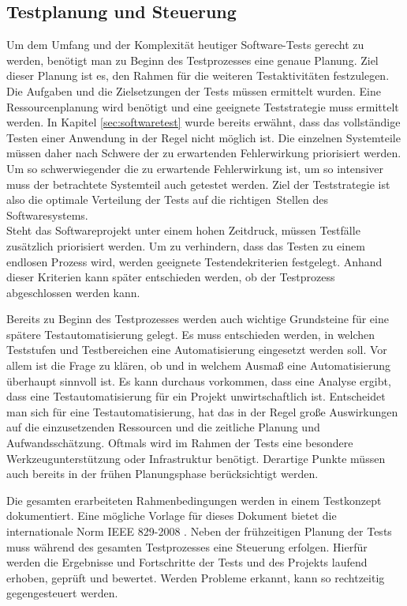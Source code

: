 \subsection{Testplanung und Steuerung}
\label{subsec:testplanung_und_steuerung}
Um dem Umfang und der Komplexität heutiger Software-Tests gerecht zu werden, benötigt man zu Beginn des Testprozesses eine genaue Planung.
Ziel dieser Planung ist es, den Rahmen für die weiteren Testaktivitäten festzulegen. Die Aufgaben und die Zielsetzungen der Tests müssen ermittelt wurden. Eine Ressourcenplanung wird benötigt und eine geeignete Teststrategie muss ermittelt werden. In Kapitel \ref{sec:softwaretest} wurde bereits erwähnt, dass das vollständige Testen einer Anwendung in der Regel nicht möglich ist. Die einzelnen Systemteile müssen daher nach Schwere der zu erwartenden Fehlerwirkung priorisiert werden. Um so schwerwiegender die zu erwartende Fehlerwirkung ist, um so intensiver muss der betrachtete Systemteil auch getestet werden. Ziel der Teststrategie ist also \glqq die optimale Verteilung der Tests auf die \frqq richtigen\flqq\ Stellen des Softwaresystems.\grqq\ \cite[S.21]{spillner_basiswissen_2007} \\ Steht das Softwareprojekt unter einem hohen Zeitdruck, müssen Testfälle zusätzlich priorisiert werden.
Um zu verhindern, dass das Testen zu einem endlosen Prozess wird, werden geeignete Testendekriterien festgelegt. Anhand dieser Kriterien kann später entschieden werden, ob der Testprozess abgeschlossen werden kann.

Bereits zu Beginn des Testprozesses werden auch wichtige Grundsteine für eine spätere Testautomatisierung gelegt. Es muss entschieden werden, in welchen Teststufen und Testbereichen eine Automatisierung eingesetzt werden soll. Vor allem ist die Frage zu klären, ob und in welchem Ausmaß eine Automatisierung überhaupt sinnvoll ist. Es kann durchaus vorkommen, dass eine Analyse ergibt, dass eine Testautomatisierung für ein Projekt unwirtschaftlich ist.
Entscheidet man sich für eine Testautomatisierung, hat das in der Regel große Auswirkungen auf die einzusetzenden Ressourcen und die zeitliche Planung und Aufwandsschätzung.
Oftmals wird im Rahmen der Tests eine besondere Werkzeugunterstützung oder Infrastruktur benötigt. Derartige Punkte müssen auch bereits in der frühen Planungsphase berücksichtigt werden.

Die gesamten erarbeiteten Rahmenbedingungen werden in einem Testkonzept dokumentiert.
Eine mögliche Vorlage für dieses Dokument bietet die internationale Norm IEEE 829-2008 \cite{ieee_ieee_2008}.
Neben der frühzeitigen Planung der Tests muss während des gesamten Testprozesses eine Steuerung erfolgen.
Hierfür werden die Ergebnisse und Fortschritte der Tests und des Projekts laufend erhoben, geprüft und bewertet. Werden Probleme erkannt, kann so rechtzeitig gegengesteuert werden. 

